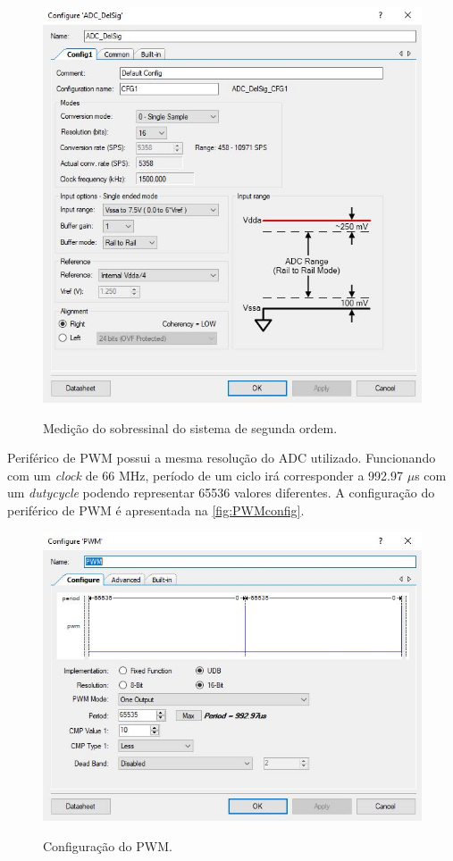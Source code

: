 \documentclass[
	article,			%
	11pt,				%
	oneside,			%
	a4paper,			%
	english,			%
	brazil,				%
	sumario=tradicional
	]{abntex2}
\begin{document}
\begin{figure}[htb!]
	\centering
	\caption{Medição do sobressinal do sistema de segunda ordem.}
	\includegraphics[scale=0.9]{./img/ADCconfig.JPG}
	\label{fig:ADCconfig}
\end{figure}

\pagebreak

Periférico de PWM possui a mesma resolução do ADC utilizado.
Funcionando com um \textit{clock} de 66 MHz, período de um ciclo irá corresponder a 992.97 $\mu$s com um \textit{dutycycle} podendo representar 65536 valores diferentes.
A configuração do periférico de PWM é apresentada na \autoref{fig:PWMconfig}.

\begin{figure}[htb!]
	\centering
	\caption{Configuração do PWM.}
	\includegraphics[scale=0.90]{./img/PWMconfig.JPG}
	\label{fig:PWMconfig}
\end{figure}
\end{document}
